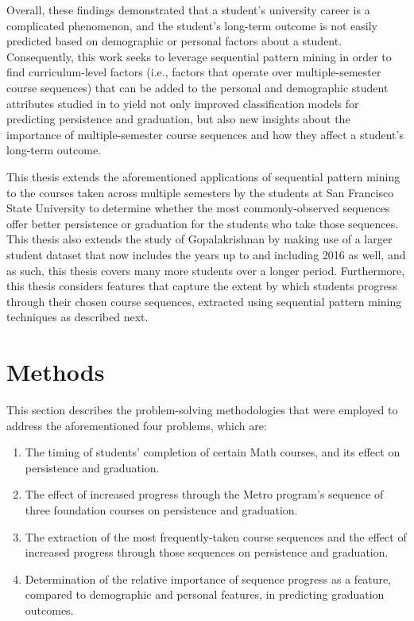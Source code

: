 Overall, these findings demonstrated that a student's university career is a complicated phenomenon, and the student's long-term outcome is not easily predicted based on demographic or personal factors about a student. Consequently, this work seeks to leverage sequential pattern mining in order to find curriculum-level factors (i.e., factors that operate over multiple-semester course sequences) that can be added to the personal and demographic student attributes studied in \cite{Gopalakrishnan} to yield not only improved classification models for predicting persistence and graduation, but also new insights about the importance of multiple-semester course sequences and how they affect a student's long-term outcome. 

This thesis extends the aforementioned applications of sequential pattern mining to the courses taken across multiple semesters by the students at San Francisco State University to determine whether the most commonly-observed sequences offer better persistence or graduation for the students who take those sequences.  This thesis also extends the study of Gopalakrishnan \cite{Gopalakrishnan} by making use of a larger student dataset that now includes the years up to and including 2016 as well, and as such, this thesis covers many more students over a longer period.  Furthermore, this thesis considers features that capture the extent by which students progress through their chosen course sequences, extracted using sequential pattern mining techniques as described next.

\chapter{Methods}

This section describes the problem-solving methodologies that were employed to address the aforementioned four problems, which are:

\begin{enumerate}
  \item The timing of students' completion of certain Math courses, and its effect on persistence and graduation.
  \item The effect of increased progress through the Metro program's sequence of three foundation courses on persistence and graduation.
  \item The extraction of the most frequently-taken course sequences and the effect of increased progress through those sequences on persistence and graduation.
  \item Determination of the relative importance of sequence progress as a feature, compared to demographic and personal features, in predicting graduation outcomes.
\end{enumerate}



